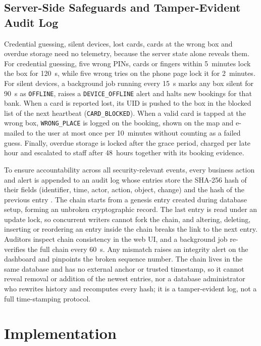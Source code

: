 \documentclass[journal,onecolumn]{IEEEtran}
\begin{document}
\subsection{Server-Side Safeguards and Tamper-Evident Audit Log}

Credential guessing, silent devices, lost cards, cards at the wrong box and overdue storage need no telemetry, because
the server state alone reveals them. For credential guessing, five wrong PINs, cards or fingers within 5~minutes lock
the box for 120~s, while five wrong tries on the phone page lock it for 2~minutes. For silent devices, a background job
running every 15~s marks any box silent for 90~s as \texttt{OFFLINE}, raises a \texttt{DEVICE\_OFFLINE} alert and halts
new bookings for that bank. When a card is reported lost, its UID is pushed to the box in the blocked list of the next
heartbeat (\texttt{CARD\_BLOCKED}). When a valid card is tapped at the wrong box, \texttt{WRONG\_PLACE} is logged on the
booking, shown on the map and e-mailed to the user at most once per 10~minutes without counting as a failed guess.
Finally, overdue storage is locked after the grace period, charged per late hour and escalated to staff after 48~hours
together with its booking evidence.

To ensure accountability across all security-relevant events, every business action and alert is appended to an audit log
whose entries store the SHA-256 hash of their fields (identifier, time, actor, action, object, change) and the hash of the
previous entry \cite{haber1991timestamp}. The chain starts from a genesis entry created during database setup, forming an
unbroken cryptographic record. The last entry is read under an update lock, so concurrent writers cannot fork the chain, and
altering, deleting, inserting or reordering an entry inside the chain breaks the link to the next entry. Auditors inspect
chain consistency in the web UI, and a background job re-verifies the full chain every 60~s. Any mismatch raises an
integrity alert on the dashboard and pinpoints the broken sequence number. The chain lives in the same database and has
no external anchor or trusted timestamp, so it cannot reveal removal or addition of the newest entries, nor a database
administrator who rewrites history and recomputes every hash; it is a tamper-evident log, not a full time-stamping
protocol.

\section{Implementation}
\end{document}
